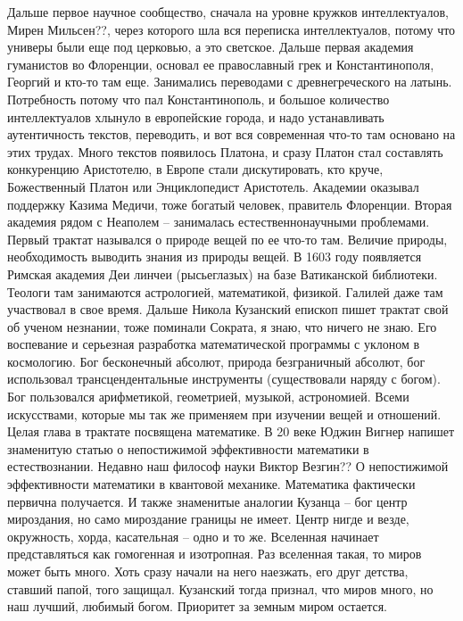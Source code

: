 \documentclass[a4paper, 12pt]{article}
\begin{document}
Дальше первое научное сообщество, сначала на уровне кружков 
интеллектуалов, Мирен Мильсен??, через которого шла вся переписка 
интеллектуалов, потому что универы были еще под церковью, а это 
светское. Дальше первая академия гуманистов во Флоренции, основал ее 
православный грек и Константинополя, Георгий и кто-то там еще. 
Занимались переводами с древнегреческого на латынь. Потребность потому 
что пал Константинополь, и большое количество интеллектуалов хлынуло 
в европейские города, и надо устанавливать аутентичность текстов, 
переводить, и вот вся современная что-то там основано на этих трудах. 
Много текстов появилось Платона, и сразу Платон стал составлять 
конкуренцию Аристотелю, в Европе стали дискутировать, кто круче, 
Божественный Платон или Энциклопедист Аристотель. Академии оказывал 
поддержку Казима Медичи, тоже богатый человек, правитель Флоренции. 
Вторая академия рядом с Неаполем -- занималась естественнонаучными 
проблемами. Первый трактат назывался о природе вещей по ее что-то там. 
Величие природы, необходимость выводить знания из природы вещей. В 1603 
году появляется Римская академия Деи линчеи (рысьеглазых) на базе 
Ватиканской библиотеки. Теологи там занимаются астрологией, математикой, 
физикой. Галилей даже там участвовал в свое время. Дальше Никола 
Кузанский епископ пишет трактат свой об ученом незнании, тоже поминали 
Сократа, я знаю, что ничего не знаю. Его воспевание и серьезная 
разработка математической программы с уклоном в космологию. Бог 
бесконечный абсолют, природа безграничный абсолют, бог использовал 
трансцендентальные инструменты (существовали наряду с богом). Бог 
пользовался арифметикой, геометрией, музыкой, астрономией. Всеми 
искусствами, которые мы так же применяем при изучении вещей и отношений. 
Целая глава в трактате посвящена математике. В 20 веке Юджин Вигнер 
напишет знаменитую статью о непостижимой эффективности математики 
в естествознании. Недавно наш философ науки Виктор Везгин?? 
О непостижимой эффективности математики в квантовой механике. Математика 
фактически первична получается. И также знаменитые аналогии Кузанца -- 
бог центр мироздания, но само мироздание границы не имеет. Центр нигде 
и везде, окружность, хорда, касательная -- одно и то же. Вселенная 
начинает представляться как гомогенная и изотропная. Раз вселенная 
такая, то миров может быть много. Хоть сразу начали на него наезжать, 
его друг детства, ставший папой, того защищал. Кузанский тогда признал, 
что миров много, но наш лучший, любимый богом. Приоритет за земным миром 
остается.
\end{document}
